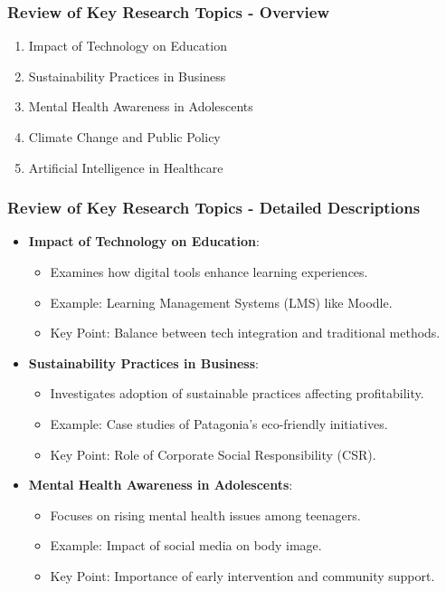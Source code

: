 \documentclass[aspectratio=169]{beamer}
\begin{document}
\begin{frame}[fragile]
    \frametitle{Review of Key Research Topics - Overview}
    \begin{enumerate}
        \item Impact of Technology on Education
        \item Sustainability Practices in Business
        \item Mental Health Awareness in Adolescents
        \item Climate Change and Public Policy
        \item Artificial Intelligence in Healthcare
    \end{enumerate}
\end{frame}

\begin{frame}[fragile]
    \frametitle{Review of Key Research Topics - Detailed Descriptions}
    \begin{itemize}
        \item \textbf{Impact of Technology on Education}:
            \begin{itemize}
                \item Examines how digital tools enhance learning experiences.
                \item Example: Learning Management Systems (LMS) like Moodle.
                \item Key Point: Balance between tech integration and traditional methods.
            \end{itemize}
        
        \item \textbf{Sustainability Practices in Business}:
            \begin{itemize}
                \item Investigates adoption of sustainable practices affecting profitability.
                \item Example: Case studies of Patagonia's eco-friendly initiatives.
                \item Key Point: Role of Corporate Social Responsibility (CSR).
            \end{itemize}
        
        \item \textbf{Mental Health Awareness in Adolescents}:
            \begin{itemize}
                \item Focuses on rising mental health issues among teenagers.
                \item Example: Impact of social media on body image.
                \item Key Point: Importance of early intervention and community support.
            \end{itemize}
        

\end{itemize}
\end{frame}
\end{document}
